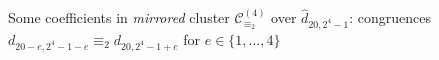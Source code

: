 
\begin{figure}[htb]

    \noindent{}

    \captionsetup{singlelinecheck=off}
    \caption[\emph{Mirrored} principal clusters $\mathcal{C}_{\equiv_{2}}^{(4)}$]
        {Some coefficients in \emph{mirrored} cluster $\mathcal{C}_{\equiv_{2}}^{(4)}$ 
        over $\hat{d}_{20,2^{4}-1}$: congruences $d_{20-e,2^{4}-1-e} \equiv_{2} d_{20,2^{4}-1+e}$ 
        for $e\in\lbrace1,\ldots,4\rbrace$ }

    \label{fig:catalan-mirrored-clusters}

\end{figure}
